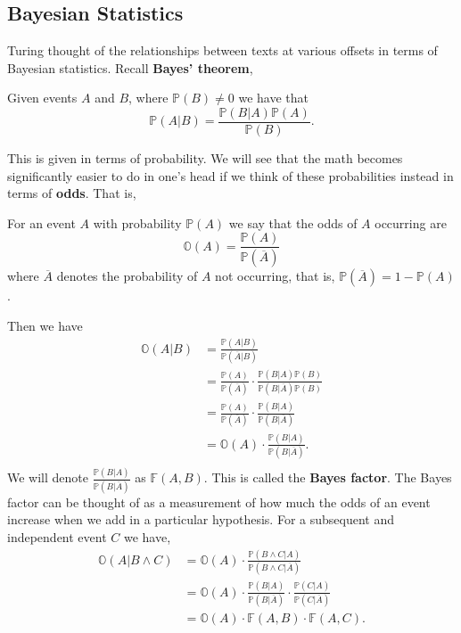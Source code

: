 \subsection{Bayesian Statistics}
Turing thought of the relationships between texts at various
offsets in terms of Bayesian statistics. Recall {\bf{Bayes' theorem}},
\begin{theorem}
  Given events $A$ and $B$, where $\mathbb{P}(B) \ne 0$ we have that
  \[
    \mathbb{P}(A|B) = \frac{\mathbb{P}(B|A)\mathbb{P}(A)}{\mathbb{P}(B)}.
  \]
\end{theorem}
\noindent This is given in terms of probability. We will see that
the math becomes significantly easier to do in one's head if we
think of these probabilities instead in terms of {\bf{odds}}. That is,
\begin{definition}
  For an event $A$ with probability $\mathbb{P}(A)$ we say that the
  odds of $A$ occurring are
  \[
    \mathbb{O}(A) = \frac{\mathbb{P}(A)}{\mathbb{P}(\overline{A})}
  \]
  where $\overline{A}$ denotes the probability of $A$ not occurring,
  that is, $\mathbb{P}(\overline{A}) = 1-\mathbb{P}(A)$.
\end{definition}
\noindent Then we have
\begin{align*}
  \mathbb{O}(A|B) & =
  \frac{\mathbb{P}(A|B)}{\mathbb{P}(\overline{A}|B)}
  \\
  & =
  \frac{\mathbb{P}(A)}{\mathbb{P}(\overline{A})}\cdot\frac{\mathbb{P}(B|A)\mathbb{P}(B)}{\mathbb{P}(B|\overline{A})\mathbb{P}(B)}
  \\
  & =
  \frac{\mathbb{P}(A)}{\mathbb{P}(\overline{A})}\cdot\frac{\mathbb{P}(B|A)}{\mathbb{P}(B|\overline{A})}
  \\
  & =
  \mathbb{O}(A)\cdot\frac{\mathbb{P}(B|A)}{\mathbb{P}(B|\overline{A})}.
  \\
\end{align*}
\noindent We will denote
$\frac{\mathbb{P}(B|A)}{\mathbb{P}(B|\overline{A})}$ as
$\mathbb{F}(A,B)$. This is called the {\bf{Bayes factor}}. The
Bayes factor can be thought of as a measurement of how much the
odds of an event increase when we add in a particular hypothesis.
For a subsequent and independent event $C$ we have,
\begin{align*}
  \mathbb{O}(A|B\wedge C) & =
  \mathbb{O}(A)\cdot\frac{\mathbb{P}(B\wedge C|
  A)}{\mathbb{P}(B\wedge C| \overline{A})}
  \\
  & = \mathbb{O}(A)\cdot\frac{\mathbb{P}(B| A)}{\mathbb{P}(B|
  \overline{A})}\cdot\frac{\mathbb{P}(C|A)}{\mathbb{P}(C|\overline{A})}
  \\
  & = \mathbb{O}(A)\cdot \mathbb{F}(A,B) \cdot \mathbb{F}(A,C).
\end{align*}
